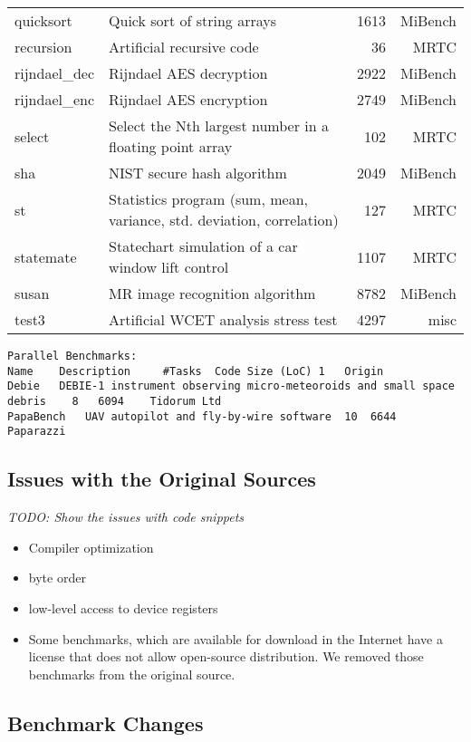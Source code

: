 \documentclass[a4paper,UKenglish]{oasics}
\newcommand{\todo}[1]{{\emph{TODO: #1}}}
\begin{document}
\begin{center}
\begin{longtable}{lp{5cm}rr}
    quicksort &  Quick sort of string arrays  & 1613 & MiBench \\
    recursion &  Artificial recursive code  & 36 & MRTC \\
    rijndael\_dec & Rijndael AES decryption  & 2922 & MiBench \\
    rijndael\_enc & Rijndael AES encryption  & 2749 & MiBench \\
    select & Select the Nth largest number in a floating point array  & 102 & MRTC \\
    sha &  NIST secure hash algorithm & 2049  & MiBench \\
    st & Statistics program (sum, mean, variance, std. deviation, correlation)  & 127  & MRTC \\
    statemate &  Statechart simulation of a car window lift control & 1107 & MRTC \\
    susan &  MR image recognition algorithm & 8782 & MiBench \\
    test3 &  Artificial WCET analysis stress test & 4297 & misc \\
\end{longtable}
\end{center}


\begin{verbatim}
Parallel Benchmarks:
Name 	Description 	#Tasks 	Code Size (LoC) 1 	Origin
Debie 	DEBIE-1 instrument observing micro-meteoroids and small space debris 	8 	6094 	Tidorum Ltd
PapaBench 	UAV autopilot and fly-by-wire software 	10 	6644 	Paparazzi
\end{verbatim}


\subsection{Issues with the Original Sources}


\todo{Show the issues with code snippets}

\begin{itemize}
\item Compiler optimization
\item byte order
\item low-level access to device registers
\item Some benchmarks, which are available for download in the Internet have a license that
does not allow open-source distribution. We removed those benchmarks from the original source.
\end{itemize}

\subsection{Benchmark Changes}
\end{document}
